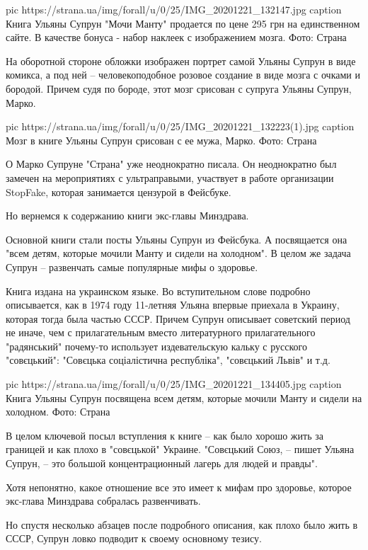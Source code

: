 \ifcmt
pic https://strana.ua/img/forall/u/0/25/IMG_20201221_132147.jpg
caption Книга Ульяны Супрун "Мочи Манту" продается по цене 295 грн на единственном сайте. В качестве бонуса - набор наклеек с изображением мозга. Фото: Страна
\fi

На оборотной стороне обложки изображен портрет самой Ульяны Супрун в виде
комикса, а под ней – человекоподобное розовое создание в виде мозга с очками и
бородой. Причем судя по бороде, этот мозг срисован с супруга Ульяны Супрун,
Марко. 

\ifcmt
pic https://strana.ua/img/forall/u/0/25/IMG_20201221_132223(1).jpg
caption Мозг в книге Ульяны Супрун срисован с ее мужа, Марко. Фото: Страна
\fi

О Марко Супруне "Страна" уже неоднократно писала. Он неоднократно был замечен
на мероприятиях с ультраправыми, участвует в работе организации StopFake,
которая занимается цензурой в Фейсбуке. 
 
Но вернемся к содержанию книги экс-главы Минздрава.
 
Основной книги стали посты Ульяны Супрун из Фейсбука. А посвящается она  "всем
детям, которые мочили Манту и сидели на холодном". В целом же задача Супрун –
развенчать самые популярные мифы о здоровье.  
 
Книга издана на украинском языке. Во вступительном слове подробно описывается,
как в 1974 году 11-летняя Ульяна впервые приехала в Украину, которая тогда была
частью СССР. Причем Супрун описывает советский период не иначе, чем с
прилагательным вместо литературного прилагательного "радянський" почему-то
использует издевательскую кальку с русского "совєцький": "Совєцька
соціалістична республіка", "совєцький Львів" и т.д.

\ifcmt
pic https://strana.ua/img/forall/u/0/25/IMG_20201221_134405.jpg
caption Книга Ульяны Супрун посвящена всем детям, которые мочили Манту и сидели на холодном. Фото: Страна
\fi

В целом ключевой посыл вступления к книге – как было хорошо жить за границей и
как плохо в "совєцькой" Украине. "Совєцький Союз, – пишет Ульяна Супрун, – это
большой концентрационный лагерь для людей и правды".
 
Хотя непонятно, какое отношение все это имеет к мифам про здоровье, которое
экс-глава Минздрава собралась развенчивать.
 
Но спустя несколько абзацев после подробного описания, как плохо было жить в
СССР, Супрун ловко подводит к своему основному тезису.
 
